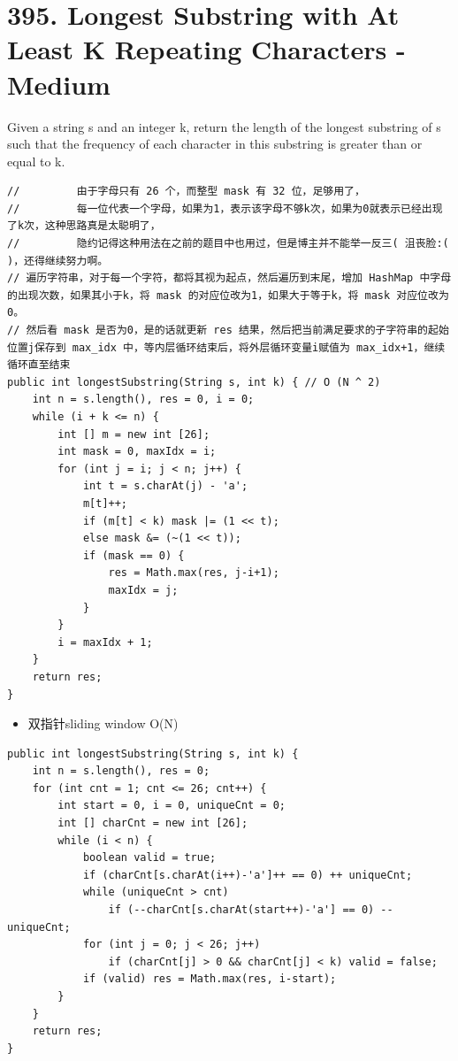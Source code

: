 \documentclass[9pt, b5paaper]{book}
\begin{document}
\section{395. Longest Substring with At Least K Repeating Characters - Medium}
\label{sec-6-6}
Given a string s and an integer k, return the length of the longest substring of s such that the frequency of each character in this substring is greater than or equal to k.
\begin{verbatim}
//         由于字母只有 26 个，而整型 mask 有 32 位，足够用了，
//         每一位代表一个字母，如果为1，表示该字母不够k次，如果为0就表示已经出现了k次，这种思路真是太聪明了，
//         隐约记得这种用法在之前的题目中也用过，但是博主并不能举一反三( 沮丧脸:( )，还得继续努力啊。
// 遍历字符串，对于每一个字符，都将其视为起点，然后遍历到末尾，增加 HashMap 中字母的出现次数，如果其小于k，将 mask 的对应位改为1，如果大于等于k，将 mask 对应位改为0。
// 然后看 mask 是否为0，是的话就更新 res 结果，然后把当前满足要求的子字符串的起始位置j保存到 max_idx 中，等内层循环结束后，将外层循环变量i赋值为 max_idx+1，继续循环直至结束
public int longestSubstring(String s, int k) { // O (N ^ 2)
    int n = s.length(), res = 0, i = 0;
    while (i + k <= n) {
        int [] m = new int [26];
        int mask = 0, maxIdx = i;
        for (int j = i; j < n; j++) {
            int t = s.charAt(j) - 'a';
            m[t]++;
            if (m[t] < k) mask |= (1 << t);
            else mask &= (~(1 << t));
            if (mask == 0) {
                res = Math.max(res, j-i+1);
                maxIdx = j;
            }
        }
        i = maxIdx + 1;
    }
    return res;
}
\end{verbatim}
\begin{itemize}
\item 双指针sliding window O(N)
\end{itemize}
\begin{verbatim}
public int longestSubstring(String s, int k) {
    int n = s.length(), res = 0;
    for (int cnt = 1; cnt <= 26; cnt++) {
        int start = 0, i = 0, uniqueCnt = 0;
        int [] charCnt = new int [26];
        while (i < n) {
            boolean valid = true;
            if (charCnt[s.charAt(i++)-'a']++ == 0) ++ uniqueCnt;
            while (uniqueCnt > cnt) 
                if (--charCnt[s.charAt(start++)-'a'] == 0) --uniqueCnt;
            for (int j = 0; j < 26; j++)
                if (charCnt[j] > 0 && charCnt[j] < k) valid = false;
            if (valid) res = Math.max(res, i-start);
        }
    }
    return res;
}
\end{verbatim}
\end{document}
